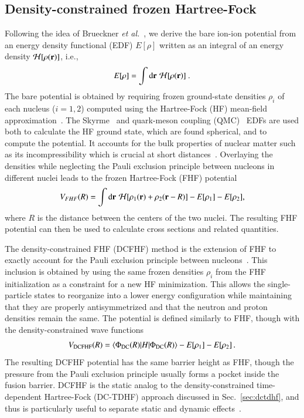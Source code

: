\subsection{Density-constrained frozen Hartree-Fock}\label{sec:dcfhf}
Following the idea of Brueckner \textit{et al.}~\protect\citep{brueckner1968}, we derive the bare ion-ion potential from an energy density functional (EDF)  $E[\rho]$
written as an integral of an energy density ${\mathcal{H}}[\rho({\bf r})]$, i.e.,
\begin{equation}
E[\rho]=\int {\mbox d}{\bf r} \,\, {\mathcal{H}}[\rho({\bf r})]~.
\end{equation}
The bare potential is obtained by requiring frozen ground-state densities $\rho_{i}$ of each nucleus ($i=1,2$) computed using the Hartree-Fock (HF) mean-field approximation~\protect\citep{hartree1928,fock1930}.
The Skyrme~\protect\citep{skyrme1956} and quark-meson coupling (QMC)~\protect\citep{stone2016} EDFs are used both to calculate the HF ground state, which are found spherical, and to compute the potential.
It accounts for the bulk properties of nuclear matter such as its incompressibility which is crucial at short distances~\protect\citep{brueckner1968,misicu2006,hossain2015}.
Overlaying the densities while neglecting the Pauli exclusion principle between nucleons in different nuclei
leads to the frozen Hartree-Fock (FHF) potential~\protect\citep{washiyama2008,simenel2008,simenel2012}
\begin{equation}
V_{FHF}(R)=\int {\mbox d}{\bf r} \,\, {\mathcal{H}}[\rho_1({\bf r})+\rho_2({\bf r}-R)] - E[\rho_1] -E[\rho_2],
\label{eq:frozen}
\end{equation}
where $R$ is the distance between the centers of the two nuclei.
The resulting FHF potential can then be used to calculate cross sections and related quantities.

The density-constrained FHF (DCFHF) method is the extension of FHF to exactly account for the Pauli exclusion principle between nucleons~\protect\citep{simenel2017}.
This inclusion is obtained by using the same frozen densities $\rho_{i}$ from the FHF initialization as a constraint for a new HF minimization.
This allows the single-particle states to reorganize into a lower energy configuration while maintaining that they are properly antisymmetrized and that the neutron and proton densities remain the same.
The potential is defined similarly to FHF, though with the density-constrained wave functions~\protect\citep{simenel2017}
\begin{equation}
V_{\mathrm{DCFHF}}(R)=\langle\Phi_{\mathrm{DC}}(R) | H | \Phi_{\mathrm{DC}}(R) \rangle-E[\rho_1]-E[\rho_2]\,.
\label{eq:vr}
\end{equation}
The resulting DCFHF potential has the same barrier height as FHF, though the pressure from the Pauli exclusion principle usually forms a pocket inside the fusion barrier.
DCFHF is the static analog to the density-constrained time-dependent Hartree-Fock (DC-TDHF) approach discussed in Sec.~\ref{sec:dctdhf}, and thus is particularly useful to separate static and dynamic effects~\protect\citep{vophuoc2016}.

